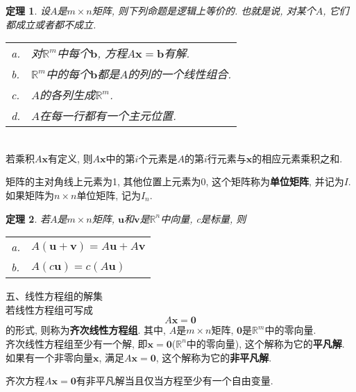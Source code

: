 \documentclass[UTF8,fontset=ubuntu]{ctexart}
\theoremstyle{nonumberplain}
\theoremstyle{break}
\newtheorem{theorem}{定理}
\theoremstyle{empty}
\begin{document}
\begin{theorem}
设$A$是$m\times n$矩阵, 则下列命题是逻辑上等价的. 也就是说, 对某个$A$, 它们都成立或者都不成立.\\
\begin{tabular}{l@{\,}l}
a. & 对$\mathbb{R}^m$中每个$\bm{b}$, 方程$A\bm{x}=\bm{b}$有解.\\
b. & $\mathbb{R}^m$中的每个$\bm{b}$都是$A$的列的一个线性组合.\\
c. & $A$的各列生成$\mathbb{R}^m$.\\
d. & $A$在每一行都有一个主元位置.\\[2ex]
\end{tabular}
\end{theorem}\vspace{2ex}

\begin{law}[计算$A\bm{x}$的行--向量规则]\ \\
若乘积$A\bm{x}$有定义, 则$A\bm{x}$中的第$i$个元素是$A$的第$i$行元素与$\bm{x}$的相应元素乘积之和.
\end{law}\vspace{2ex}

矩阵的主对角线上元素为1, 其他位置上元素为0, 这个矩阵称为\textbf{单位矩阵}, 并记为$I$.\\
如果矩阵为$n\times n$单位矩阵, 记为$I_n$.\\[2ex]

\begin{theorem}
若$A$是$m\times n$矩阵, $\bm{u}$和$\bm{v}$是$\mathbb{R}^n$中向量, c是标量, 则\\
\begin{tabular}{l@{\,}l}
a. & $A(\bm{u}+\bm{v})=A\bm{u}+A\bm{v}$\\
b. & $A(c\bm{u})=c(A\bm{u})$
\end{tabular}
\end{theorem}\vspace{6ex}

五、线性方程组的解集\\[1ex]
若线性方程组可写成
\[A\bm{x}=\bm{0}\]
的形式, 则称为\textbf{齐次线性方程组}. 其中, $A$是$m\times n$矩阵, $\bm{0}$是$\mathbb{R}^m$中的零向量.\\
齐次线性方程组至少有一个解, 即$\bm{x}=\bm{0}$($\mathbb{R}^n$中的零向量), 这个解称为它的\textbf{平凡解}.\\
如果有一个非零向量$\bm{x}$, 满足$A\bm{x}=\bm{0}$, 这个解称为它的\textbf{非平凡解}.\\[2ex]

\begin{law}
齐次方程$A\bm{x}=\bm{0}$有非平凡解当且仅当方程至少有一个自由变量.
\end{law}\vspace{2ex}
\end{document}
